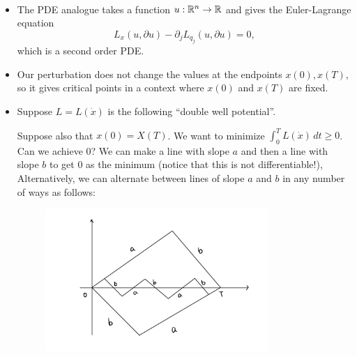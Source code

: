 \begin{remark}
    ~\
    \begin{itemize}
        \item The PDE analogue takes a function $u: \mathbb{R}^n \to \mathbb{R}$ and gives the Euler-Lagrange equation 
        \[
            L_x(u, \partial u) - \partial_j L_{q_j}(u, \partial u) = 0,
        \]
        which is a second order PDE.
        \item Our perturbation does not change the values at the endpoints $x(0), x(T)$, so it gives critical points in a context where $x(0)$ and $x(T)$ are fixed. 
        \begin{figure}[H]
            \centering
        \end{figure}
        \item Suppose $L = L(\dot x)$ is the following ``double well potential''. 
        \begin{figure}[H]
            \centering
        \end{figure}
        Suppose also that $x(0)=X(T)$. We want to minimize $\int_0^T L(\dot x)\, dt \ge 0$. Can we achieve $0$? We can make a line with slope $a$ and then a line with slope $b$ to get $0$ as the minimum (notice that this is not differentiable!), Alternatively, we can alternate between lines of slope $a$ and $b$ in any number of ways as follows: 
        \begin{figure}[H]
            \centering
            \includegraphics[width=0.8\textwidth]{pics/8-1.png}

\end{figure}
\end{itemize}
\end{remark}
